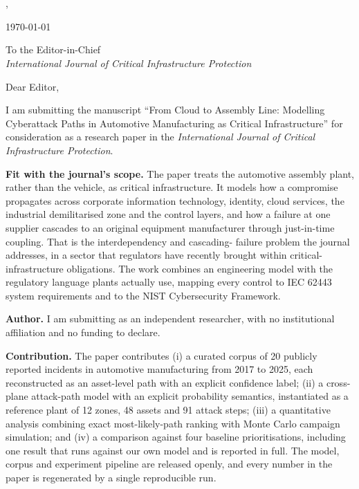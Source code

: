 \documentclass[11pt,a4paper]{article}
\begin{document}
\noindent \capmauthor\\
\capmaffiliation\\
\capmcity, \capmcountry\\
\capmemail

\vspace{0.6cm}
\noindent \today

\vspace{0.6cm}
\noindent To the Editor-in-Chief\\
\textit{International Journal of Critical Infrastructure Protection}

\vspace{0.6cm}

\noindent Dear Editor,

\vspace{0.3cm}

I am submitting the manuscript ``From Cloud to Assembly Line: Modelling
Cyberattack Paths in Automotive Manufacturing as Critical Infrastructure'' for
consideration as a research paper in the \textit{International Journal of
Critical Infrastructure Protection}.

\vspace{0.3cm}

\noindent\textbf{Fit with the journal's scope.} The paper treats the automotive
assembly plant, rather than the vehicle, as critical infrastructure. It models
how a compromise propagates across corporate information technology, identity,
cloud services, the industrial demilitarised zone and the control layers, and
how a failure at one supplier cascades to an original equipment manufacturer
through just-in-time coupling. That is the interdependency and cascading-
failure problem the journal addresses, in a sector that regulators have
recently brought within critical-infrastructure obligations. The work combines an engineering
model with the regulatory language plants actually use, mapping every control to
IEC 62443 system requirements and to the NIST Cybersecurity Framework.

\vspace{0.3cm}

\noindent\textbf{Author.} I am submitting as an independent researcher, with no
institutional affiliation and no funding to declare.

\noindent\textbf{Contribution.} The paper contributes (i) a curated corpus of 20
publicly reported incidents in automotive manufacturing from 2017 to 2025, each
reconstructed as an asset-level path with an explicit confidence label; (ii) a
cross-plane attack-path model with an explicit probability semantics, instantiated
as a reference plant of 12 zones, 48 assets and 91 attack steps; (iii) a
quantitative analysis combining exact most-likely-path ranking with Monte Carlo
campaign simulation; and (iv) a comparison against four baseline prioritisations,
including one result that runs against our own model and is reported in full. The
model, corpus and experiment pipeline are released openly, and every number in
the paper is regenerated by a single reproducible run.
\end{document}
